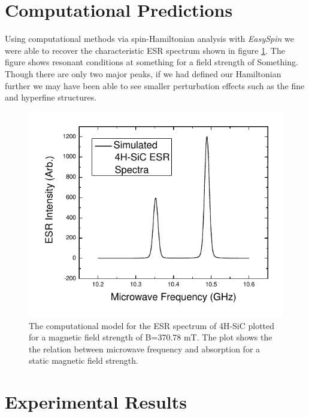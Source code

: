 \documentclass[oneside, astronomy, noacknowlegments]{BYUPhys}
\begin{document}
\section{Computational Predictions}

Using computational methods via spin-Hamiltonian analysis with \textit{EasySpin} we were able to recover the characteristic ESR spectrum shown in figure \ref{fig:SiCModel}. The figure shows resonant conditions at something for a field strength of Something. Though there are only two major peaks, if we had defined our Hamiltonian further we may have been able to see smaller perturbation effects such as the fine and hyperfine structures.

\begin{figure}
    \centerline{\includegraphics{p14-esr}}
    \caption[ESR computational model for SiC]{\label{fig:SiCModel}
     The computational model for the ESR spectrum of 4H-SiC plotted for a magnetic field strength of B=370.78 mT. The plot shows the the relation between microwave frequency and absorption for a static magnetic field strength.}
 \end{figure}

\section{Experimental Results}
\end{document}
